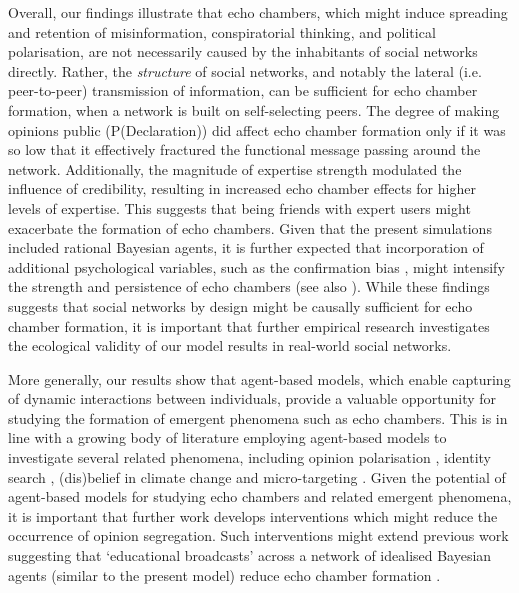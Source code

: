 \documentclass[fleqn,10pt]{wlscirep}
\begin{document}
Overall, our findings illustrate that echo chambers, which might induce spreading and retention of misinformation\cite{vosoughi2018spread}, conspiratorial thinking\cite{del2016spreading}, and political polarisation\cite{bessi2016users, del2016echo}, are not necessarily caused by the inhabitants of social networks directly. Rather, the \textit{structure} of social networks, and notably the lateral (i.e. peer-to-peer) transmission of information, can be sufficient for echo chamber formation, when a network is built on self-selecting peers. The degree of making opinions public (P(Declaration)) did affect echo chamber formation only if it was so low that it effectively fractured the functional message passing around the network. Additionally, the magnitude of expertise strength modulated the influence of credibility, resulting in increased echo chamber effects for higher levels of expertise. This suggests that being friends with expert users might exacerbate the formation of echo chambers. Given that the present simulations included rational Bayesian agents, it is further expected that incorporation of additional psychological variables, such as the confirmation bias \cite{del2016spreading, ngampruetikorn2016bias, starnini2016emergence}, might intensify the strength and persistence of echo chambers (see also \cite{pilditch2017opinion}). While these findings suggests that social networks by design might be causally sufficient for echo chamber formation, it is important that further empirical research investigates the ecological validity of our model results in real-world social networks. 

More generally, our results show that agent-based models, which enable capturing of dynamic interactions between individuals, provide a valuable opportunity for studying the formation of emergent phenomena such as echo chambers. This is in line with a growing body of literature employing agent-based models to investigate several related phenomena, including opinion polarisation \cite{duggins2017}, identity search \cite{watts2002identity}, (dis)belief in climate change \cite{williams2015network, lewandowsky2019influence} and micro-targeting \cite{madsen2018method}. Given the potential of agent-based models for studying echo chambers and related emergent phenomena, it is important that further work develops interventions which might reduce the occurrence of opinion segregation. Such interventions might extend previous work suggesting that `educational broadcasts' across a network of idealised Bayesian agents (similar to the present model) reduce echo chamber formation \cite{madsen2018large}.
\end{document}
